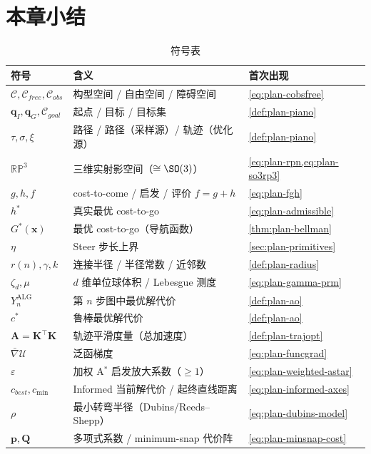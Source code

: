 \section*{本章小结}

\begin{table}[H]\centering\small
\caption{符号表}
\begin{tabular}{lll}
\toprule
符号 & 含义 & 首次出现 \\
\midrule
$\mathcal{C},\mathcal{C}_{free},\mathcal{C}_{obs}$ & 构型空间 / 自由空间 / 障碍空间 & \cref{eq:plan-cobsfree} \\
$\mathbf{q}_I,\mathbf{q}_G,\mathcal{C}_{goal}$ & 起点 / 目标 / 目标集 & \cref{def:plan-piano} \\
$\tau,\sigma,\xi$ & 路径 / 路径（采样源）/ 轨迹（优化源） & \cref{def:plan-piano} \\
$\mathbb{RP}^3$ & 三维实射影空间（$\cong\SO(3)$） & \cref{eq:plan-rpn,eq:plan-so3rp3} \\
$g,h,f$ & cost-to-come / 启发 / 评价 $f=g+h$ & \cref{eq:plan-fgh} \\
$h^*$ & 真实最优 cost-to-go & \cref{eq:plan-admissible} \\
$G^*(\mathbf{x})$ & 最优 cost-to-go（导航函数） & \cref{thm:plan-bellman} \\
$\eta$ & Steer 步长上界 & \cref{sec:plan-primitives} \\
$r(n),\gamma,k$ & 连接半径 / 半径常数 / 近邻数 & \cref{def:plan-radius} \\
$\zeta_d,\mu$ & $d$ 维单位球体积 / Lebesgue 测度 & \cref{eq:plan-gamma-prm} \\
$Y_n^{\mathrm{ALG}}$ & 第 $n$ 步图中最优解代价 & \cref{def:plan-ao} \\
$c^*$ & 鲁棒最优解代价 & \cref{def:plan-ao} \\
$\mathbf{A}=\mathbf{K}^\top\mathbf{K}$ & 轨迹平滑度量（总加速度） & \cref{def:plan-trajopt} \\
$\bar\nabla\mathcal{U}$ & 泛函梯度 & \cref{eq:plan-funcgrad} \\
$\varepsilon$ & 加权 A$^*$ 启发放大系数（$\ge1$） & \cref{eq:plan-weighted-astar} \\
$c_{best},c_{\min}$ & Informed 当前解代价 / 起终直线距离 & \cref{eq:plan-informed-axes} \\
$\rho$ & 最小转弯半径（Dubins/Reeds--Shepp） & \cref{eq:plan-dubins-model} \\
$\mathbf{p},\mathbf{Q}$ & 多项式系数 / minimum-snap 代价阵 & \cref{eq:plan-minsnap-cost} \\
\bottomrule
\end{tabular}
\end{table}

